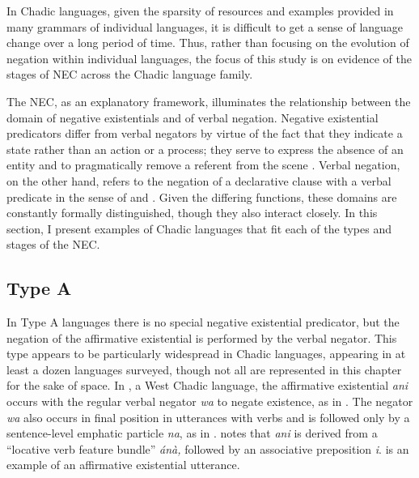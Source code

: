 \documentclass[output=paper,draft,draftmode,colorlinks,citecolor=brown]{langscibook}
\begin{document}
In Chadic languages, given the sparsity of resources and examples provided
in many grammars of individual languages, it is difficult to get a sense of
language change over a long period of time. Thus, rather than focusing on
the evolution of negation within individual languages, the focus of this
study is on evidence of the stages of NEC across the Chadic language
family. 

The NEC, as an explanatory framework, illuminates the relationship between
the domain of negative existentials and of verbal negation. Negative
existential predicators differ from verbal negators by virtue of the fact
that they indicate a state rather than an action or a process; they serve
to express the absence of an entity and to pragmatically remove a referent
from the scene \citep{Veselinova2013}. Verbal negation, on the other hand,
refers to the negation of a declarative clause with a verbal predicate in the
sense of \citet{Dahl2010} and \citet{Miestamo2005}. Given the differing
functions, these domains are constantly formally distinguished, though they also interact
closely. In this section, I present examples of Chadic languages that
fit each of the types and stages of the NEC.

\subsection{Type A}\label{sec:3:3.1}

In Type A languages there is no special negative existential predicator,
but the negation of the affirmative existential is performed by the verbal
negator. This type appears to be particularly widespread in Chadic languages, appearing in at least a dozen languages surveyed, though not all are represented in this chapter for the sake of space. In , a West
Chadic language, the affirmative existential \textit{ani} occurs with the
regular verbal negator \textit{wa} to negate existence, as in
.  The negator \textit{wa} also occurs in final
position in utterances with verbs and is followed only by a
sentence-level emphatic particle \textit{na}, as in .
\citet[102]{Skinner1979} notes that \textit{ani} is derived from a
``locative verb feature bundle'' \textit{ánà,} followed by an
associative preposition \textit{i}.  is an example of
an affirmative existential utterance.  

\newpage
\ea\label{ex:paanci-water-come-corn}
\end{document}

